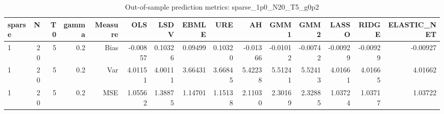 \begin{table}[!htbp]\centering
\caption{Out-of-sample prediction metrics: sparse_1p0_N20_T5_g0p2}
\label{tab:table3_sparse_1p0_N20_T5_g0p2}
\begin{tabular}{lrrrrrrrrrrrrrr}
\hline
sparse & N & T0 & gamma & Measure & OLS & LSDV & EBMLE & URE & AH & GMM1 & GMM2 & LASSO & RIDGE & ELASTIC_NET \\
\hline
1 & 20 & 5 & 0.2 & Bias & -0.00857 & 0.10326 & 0.09499 & 0.10320 & -0.01366 & -0.01012 & -0.00742 & -0.00929 & -0.00929 & -0.00927 \\
1 & 20 & 5 & 0.2 & Var & 4.01151 & 4.00111 & 3.66431 & 3.66845 & 5.42238 & 5.51241 & 5.52413 & 4.01661 & 4.01665 & 4.01662 \\
1 & 20 & 5 & 0.2 & MSE & 1.05562 & 1.38875 & 1.14701 & 1.15138 & 2.11030 & 2.30169 & 2.32885 & 1.03724 & 1.03717 & 1.03722 \\
\hline
\end{tabular}
\end{table}

